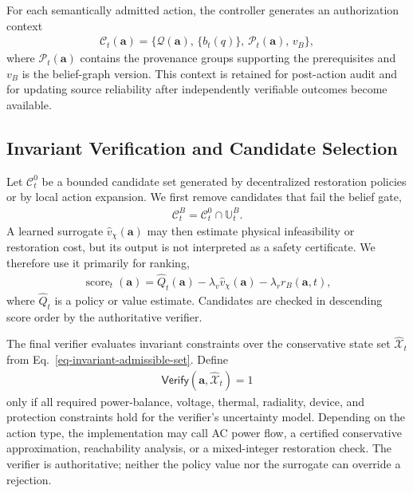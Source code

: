 For each semantically admitted action, the controller generates an authorization context
\begin{align}
\label{eq-authorization-context}
\mathcal{C}_t(\mathbf{a})=
\big\{\mathcal{Q}(\mathbf{a}),\,\{b_t(q)\},\,\mathcal{P}_t(\mathbf{a}),\,v_B\big\},
\end{align}
where $\mathcal{P}_t(\mathbf{a})$ contains the provenance groups supporting the prerequisites and $v_B$ is the belief-graph version. This context is retained for post-action audit and for updating source reliability after independently verifiable outcomes become available.

\subsection{Invariant Verification and Candidate Selection}
Let $\mathcal{C}_t^{0}$ be a bounded candidate set generated by decentralized restoration policies or by local action expansion. We first remove candidates that fail the belief gate,
\begin{align}
\label{eq-stage-belief-gate}
\mathcal{C}_t^{B}=\mathcal{C}_t^{0}\cap\mathbb{U}_t^{B}.
\end{align}
A learned surrogate $\widehat v_\chi(\mathbf{a})$ may then estimate physical infeasibility or restoration cost, but its output is not interpreted as a safety certificate. We therefore use it primarily for ranking,
\begin{align}
\label{eq-surrogate-ranking}
\operatorname{score}_t(\mathbf{a})=
\widehat Q_t(\mathbf{a})
-\lambda_v\widehat v_\chi(\mathbf{a})
-\lambda_r r_B(\mathbf{a},t),
\end{align}
where $\widehat Q_t$ is a policy or value estimate. Candidates are checked in descending score order by the authoritative verifier.

The final verifier evaluates invariant constraints over the conservative state set $\widehat{\mathcal X}_t$ from Eq.~\ref{eq-invariant-admissible-set}. Define
\begin{align}
\label{eq-authoritative-verifier}
\mathsf{Verify}(\mathbf{a},\widehat{\mathcal X}_t)=1
\end{align}
only if all required power-balance, voltage, thermal, radiality, device, and protection constraints hold for the verifier's uncertainty model. Depending on the action type, the implementation may call AC power flow, a certified conservative approximation, reachability analysis, or a mixed-integer restoration check. The verifier is authoritative; neither the policy value nor the surrogate can override a rejection.

